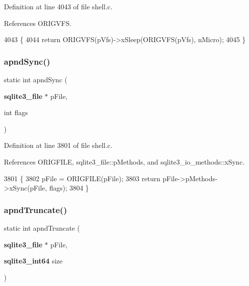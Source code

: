 Definition at line 4043 of file shell.\+c.



References O\+R\+I\+G\+V\+FS.


\begin{DoxyCode}
4043                                                    \{
4044   \textcolor{keywordflow}{return} ORIGVFS(pVfs)->xSleep(ORIGVFS(pVfs), nMicro);
4045 \}
\end{DoxyCode}
\mbox{\label{shell_8c_a4145c58e00a13901b9db111f1cd6ad93}} 
\subsubsection{apnd\+Sync()}
{\footnotesize\ttfamily static int apnd\+Sync (\begin{DoxyParamCaption}\item[{\textbf{ sqlite3\+\_\+file} $\ast$}]{p\+File,  }\item[{int}]{flags }\end{DoxyParamCaption})\hspace{0.3cm}{\ttfamily [static]}}



Definition at line 3801 of file shell.\+c.



References O\+R\+I\+G\+F\+I\+LE, sqlite3\+\_\+file\+::p\+Methods, and sqlite3\+\_\+io\+\_\+methods\+::x\+Sync.


\begin{DoxyCode}
3801                                                    \{
3802   pFile = ORIGFILE(pFile);
3803   \textcolor{keywordflow}{return} pFile->pMethods->xSync(pFile, flags);
3804 \}
\end{DoxyCode}
\mbox{\label{shell_8c_abf525bdb54a79173b0b8a9e75d42523f}} 
\subsubsection{apnd\+Truncate()}
{\footnotesize\ttfamily static int apnd\+Truncate (\begin{DoxyParamCaption}\item[{\textbf{ sqlite3\+\_\+file} $\ast$}]{p\+File,  }\item[{\textbf{ sqlite3\+\_\+int64}}]{size }\end{DoxyParamCaption})\hspace{0.3cm}{\ttfamily [static]}}




